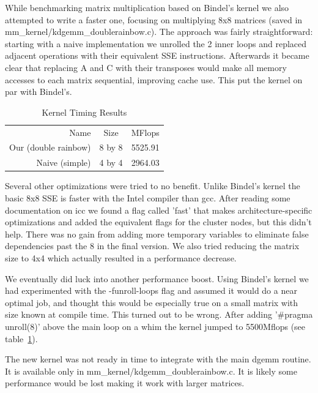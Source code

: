 \documentclass{article}
\begin{document}
While benchmarking matrix multiplication based on Bindel's kernel we also attempted to write a faster one, 
focusing on multiplying 8x8 matrices (saved in mm\_kernel/kdgemm\_doublerainbow.c). The approach was fairly straightforward: starting with a 
naive implementation we unrolled the 2 inner loops and replaced adjacent operations with their equivalent SSE instructions. 
Afterwards it became clear that replacing A and C with their transposes would make all memory accesses to each matrix sequential,
improving cache use. This put the kernel on par with Bindel's.
\begin{table}[h]
  \centering
  \begin{tabular}{r c c}
    Name & Size & MFlops\\
    Our (double rainbow) & 8 by 8 & 5525.91 \\
    Naive (simple) & 4 by 4 & 2964.03
  \end{tabular}
  \caption{Kernel Timing Results}
  \label{tab:kernel}
\end{table}
Several other optimizations were tried to no benefit. 
Unlike Bindel's kernel the basic 8x8 SSE is faster with the Intel compiler than gcc. 
After reading some documentation on icc we found a flag called 'fast' that makes architecture-specific optimizations 
and added the equivalent flags for the cluster nodes, but this didn't help. There was no gain from adding more temporary variables
to eliminate false dependencies past the 8 in the final version. We also tried reducing the matrix size to 4x4 which actually resulted in a performance decrease.

We eventually did luck into another performance boost. Using Bindel's kernel we had experimented with the -funroll-loops
flag and assumed it would do a near optimal job, and thought this would be especially true on a small matrix with size known at compile time.
This turned out to be wrong. After adding '\#pragma unroll(8)' above the main loop on a whim the kernel jumped to 5500Mflops (see table~\ref{tab:kernel}).



The new kernel was not ready in time to integrate with the main dgemm routine. It is available only in mm\_kernel/kdgemm\_doublerainbow.c. 
It is likely some performance would be lost making it work with larger matrices.
\end{document}

